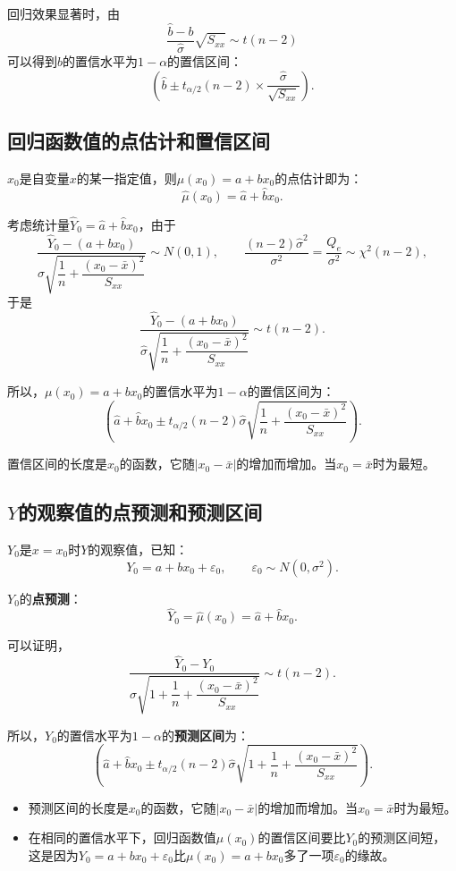 \documentclass[11pt,a4paper]{report}
\theoremstyle{definition}
\begin{document}
回归效果显著时，由
\[
\frac{\hat{b}-b}{\hat{\sigma}}\sqrt{S_{xx}}\sim t(n-2)
\]
可以得到$b$的置信水平为$1-\alpha$的置信区间：
\[
\left(\hat{b}\pm t_{\alpha/2}(n-2)\times\frac{\hat{\sigma}}{\sqrt{S_{xx}}}\right).
\]

\subsection{回归函数值的点估计和置信区间}

$x_{0}$是自变量$x$的某一指定值，则$\mu(x_{0})=a+bx_{0}$的点估计即为：
\[
\hat{\mu}(x_{0})=\hat{a}+\hat{b}x_{0}.
\]

考虑统计量$\hat{Y}_{0}=\hat{a}+\hat{b}x_{0}$，由于
\[
\frac{\hat{Y}_{0}-(a+bx_{0})}{\sigma\sqrt{\dfrac{1}{n}+\dfrac{(x_{0}-\bar{x})^{2}}{S_{xx}}}}\sim N(0,1),\qquad
\frac{(n-2)\hat{\sigma}^{2}}{\sigma^{2}}=\frac{Q_{e}}{\sigma^{2}}\sim\chi^{2}(n-2),
\]
于是
\[
\frac{\hat{Y}_{0}-(a+bx_{0})}{\hat{\sigma}\sqrt{\dfrac{1}{n}+\dfrac{(x_{0}-\bar{x})^{2}}{S_{xx}}}}\sim t(n-2).
\]

所以，$\mu(x_{0})=a+bx_{0}$的置信水平为$1-\alpha$的置信区间为：
\[
\left(\hat{a}+\hat{b}x_{0}\pm t_{\alpha/2}(n-2)\hat{\sigma}\sqrt{\frac{1}{n}+\frac{(x_{0}-\bar{x})^{2}}{S_{xx}}}\right).
\]

置信区间的长度是$x_{0}$的函数，它随$|x_{0}-\bar{x}|$的增加而增加。当$x_{0}=\bar{x}$时为最短。

\subsection{\texorpdfstring{$Y$}{Y}的观察值的点预测和预测区间}

$Y_{0}$是$x=x_{0}$时$Y$的观察值，已知：
\[
Y_{0}=a+bx_{0}+\varepsilon_{0},\qquad\varepsilon_{0}\sim N(0,\sigma^{2}).
\]

$Y_{0}$的\textbf{点预测}：
\[
\hat{Y}_{0}=\hat{\mu}(x_{0})=\hat{a}+\hat{b}x_{0}.
\]

可以证明，
\[
\frac{\hat{Y}_{0}-Y_{0}}{\hat{\sigma}\sqrt{1+\dfrac{1}{n}+\dfrac{(x_{0}-\bar{x})^{2}}{S_{xx}}}}\sim t(n-2).
\]

所以，$Y_{0}$的置信水平为$1-\alpha$的\textbf{预测区间}为：
\[
\left(\hat{a}+\hat{b}x_{0}\pm t_{\alpha/2}(n-2)\hat{\sigma}\sqrt{1+\frac{1}{n}+\frac{(x_{0}-\bar{x})^{2}}{S_{xx}}}\right).
\]

\begin{itemize}[leftmargin=2em]
    \item 预测区间的长度是$x_{0}$的函数，它随$|x_{0}-\bar{x}|$的增加而增加。当$x_{0}=\bar{x}$时为最短。
    \item 在相同的置信水平下，回归函数值$\mu(x_{0})$的置信区间要比$Y_{0}$的预测区间短，这是因为$Y_{0}=a+bx_{0}+\varepsilon_{0}$比$\mu(x_{0})=a+bx_{0}$多了一项$\varepsilon_{0}$的缘故。
\end{itemize}
\end{document}
